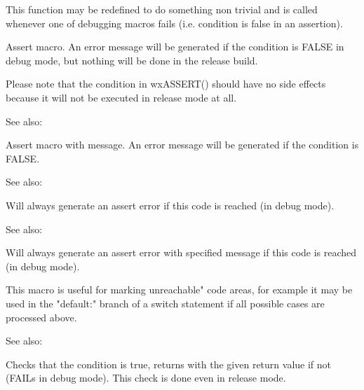 This function may be redefined to do something non trivial and is called
whenever one of debugging macros fails (i.e. condition is false in an
assertion).

\label{wxassert}


Assert macro. An error message will be generated if the condition is FALSE in
debug mode, but nothing will be done in the release build.

Please note that the condition in wxASSERT() should have no side effects
because it will not be executed in release mode at all.

See also: 

\label{wxassertmsg}


Assert macro with message. An error message will be generated if the condition is FALSE.

See also: 

\label{wxfail}


Will always generate an assert error if this code is reached (in debug mode).

See also: 

\label{wxfailmsg}


Will always generate an assert error with specified message if this code is reached (in debug mode).

This macro is useful for marking unreachable" code areas, for example
it may be used in the "default:" branch of a switch statement if all possible
cases are processed above.

See also: 

\label{wxcheck}


Checks that the condition is true, returns with the given return value if not (FAILs in debug mode).
This check is done even in release mode.

\label{wxcheckmsg}

